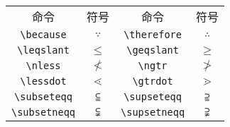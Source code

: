 \begin{multicols}{2}
\begin{enumerate}
\begin{center}
\hspace{-1.5em}\begin{tabular}{cccc}
命令 & 符号 & 命令 & 符号 \\
\verb|\because| & $\because$ & \verb|\therefore| & $\therefore$ \\  
\verb|\leqslant| & $\leqslant$ & \verb|\geqslant| & $\geqslant$ \\ 
\verb|\nless| & $\nless$ & \verb|\ngtr| & $\ngtr$ \\ 
\verb|\lessdot| & $\lessdot$ & \verb|\gtrdot| & $\gtrdot$ \\ 
\verb|\subseteqq| & $\subseteqq$ & \verb|\supseteqq| & $\supseteqq$ \\ 
\verb|\subsetneqq| & $\subsetneqq$ & \verb|\supsetneqq| & $\supsetneqq$ \\ 
\end{tabular}
\end{center}

\end{enumerate}
\end{multicols}
